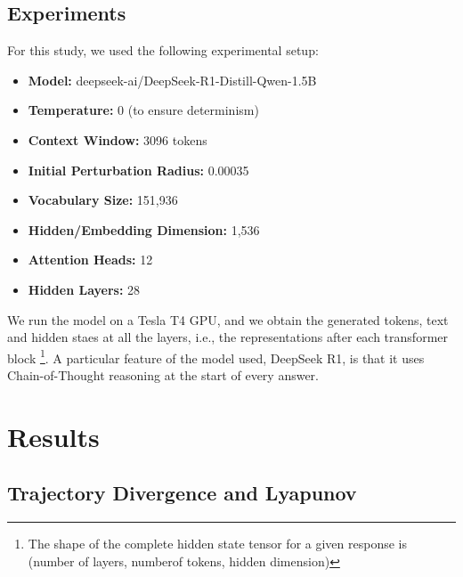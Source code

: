 \documentclass[a4paper,12pt]{article}
\begin{document}




\subsection{Experiments}
\label{subsec:experiments}

For this study, we used the following experimental setup:
\begin{itemize}
    \item \textbf{Model:} deepseek-ai/DeepSeek-R1-Distill-Qwen-1.5B
    \item \textbf{Temperature:} 0 (to ensure determinism)
    \item \textbf{Context Window:} 3096 tokens
    \item \textbf{Initial Perturbation Radius:} 0.00035
    \item \textbf{Vocabulary Size:} 151,936
    \item \textbf{Hidden/Embedding Dimension:} 1,536
    \item \textbf{Attention Heads:} 12
    \item \textbf{Hidden Layers:} 28
\end{itemize}

We run the model on a Tesla T4 GPU, and we obtain the generated tokens, text and hidden staes at all the layers, i.e., the representations after each transformer block \footnote{The shape of the complete hidden state tensor for a given response is (number of layers, numberof tokens, hidden dimension)}. A particular feature of the model used, DeepSeek R1, is that it uses Chain-of-Thought reasoning at the start of every answer.

\section{Results}
\label{sec:results}

\subsection{Trajectory Divergence and Lyapunov} \label{res:lyapunov} %
\end{document}
